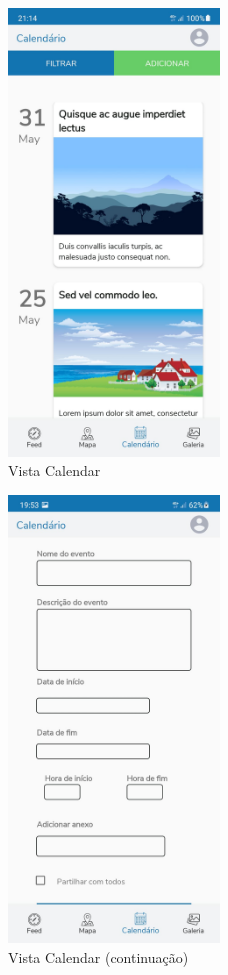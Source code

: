 \documentclass[12pt]{report}
\begin{document}
\begin{itemize}
    \bigskip
    \begin{figure}[H]
        \centering
        \includegraphics[width=0.5\textwidth]{view-calendar-1.png}
        \caption{Vista Calendar}
    \end{figure}
    
    \bigskip
    \begin{figure}[H]
        \centering
        \includegraphics[width=0.5\textwidth]{view-calendar-2.png}
        \caption{Vista Calendar (continuação)}
    \end{figure}

\end{itemize}
\end{document}

